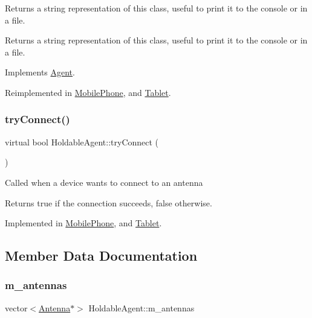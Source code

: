 Returns a string representation of this class, useful to print it to the console or in a file. \begin{DoxyReturn}{Returns}
a string representation of this class, useful to print it to the console or in a file. 
\end{DoxyReturn}


Implements \hyperlink{class_agent_a44f291596d10c7878b0641d6ec156328}{Agent}.



Reimplemented in \hyperlink{class_mobile_phone_a2b7e556d12a43e380786ad0eccf3ce04}{Mobile\+Phone}, and \hyperlink{class_tablet_a3fae01e7d526699476221c6a686a4fba}{Tablet}.

\mbox{\label{class_holdable_agent_a0789d757d81b43ee016e9362046f6dea}} 
\subsubsection{\texorpdfstring{try\+Connect()}{tryConnect()}}
{\footnotesize\ttfamily virtual bool Holdable\+Agent\+::try\+Connect (\begin{DoxyParamCaption}{ }\end{DoxyParamCaption})\hspace{0.3cm}{\ttfamily [pure virtual]}}

Called when a device wants to connect to an antenna \begin{DoxyReturn}{Returns}
true if the connection succeeds, false otherwise. 
\end{DoxyReturn}


Implemented in \hyperlink{class_mobile_phone_ad91afa811cea8ee124167f5941bcda1b}{Mobile\+Phone}, and \hyperlink{class_tablet_a2328422e1706dfeb2b51a6960e6879f0}{Tablet}.



\subsection{Member Data Documentation}
\mbox{\label{class_holdable_agent_a5f104212204e4c6761bed1d61fab100b}} 
\subsubsection{\texorpdfstring{m\+\_\+antennas}{m\_antennas}}
{\footnotesize\ttfamily vector$<$\hyperlink{class_antenna}{Antenna}$\ast$$>$ Holdable\+Agent\+::m\+\_\+antennas\hspace{0.3cm}{\ttfamily [private]}}

